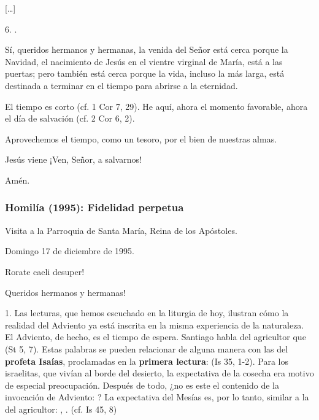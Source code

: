 {[}\ldots{}{]}

6. .

Sí, queridos hermanos y hermanas, la venida del Señor está cerca porque la Navidad, el nacimiento de Jesús en el vientre virginal de María, está a las puertas; pero también está cerca porque la vida, incluso la más larga, está destinada a terminar en el tiempo para abrirse a la eternidad.

El tiempo es corto (cf. 1 Cor 7, 29). He aquí, ahora el momento favorable, ahora el día de salvación (cf. 2 Cor 6, 2).

Aprovechemos el tiempo, como un tesoro, por el bien de nuestras almas.

Jesús viene ¡Ven, Señor, a salvarnos!

Amén.

\subsubsection{Homilía (1995): Fidelidad perpetua}

Visita a la Parroquia de Santa María, Reina de los Apóstoles.

Domingo 17 de diciembre de 1995.

Rorate caeli desuper!

Queridos hermanos y hermanas!

1. Las lecturas, que hemos escuchado en la liturgia de hoy, ilustran cómo la realidad del Adviento ya está inscrita en la misma experiencia de la naturaleza. El Adviento, de hecho, es el tiempo de espera. Santiago habla del agricultor que  (St 5, 7). Estas palabras se pueden relacionar de alguna manera con las del \textbf{profeta Isaías}, proclamadas en la \textbf{primera lectura}:  (Is 35, 1-2). Para los israelitas, que vivían al borde del desierto, la expectativa de la cosecha era motivo de especial preocupación. Después de todo, ¿no es este el contenido de la invocación de Adviento: ? La expectativa del Mesías es, por lo tanto, similar a la del agricultor: , . (cf. Is 45, 8)

